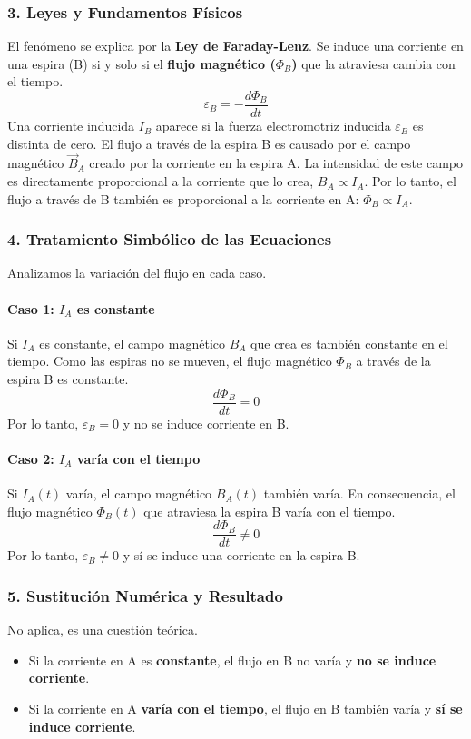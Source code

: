\subsubsection*{3. Leyes y Fundamentos Físicos}
El fenómeno se explica por la \textbf{Ley de Faraday-Lenz}. Se induce una corriente en una espira (B) si y solo si el \textbf{flujo magnético ($\Phi_B$)} que la atraviesa cambia con el tiempo.
$$\varepsilon_B = -\frac{d\Phi_B}{dt}$$
Una corriente inducida $I_B$ aparece si la fuerza electromotriz inducida $\varepsilon_B$ es distinta de cero.
El flujo a través de la espira B es causado por el campo magnético $\vec{B}_A$ creado por la corriente en la espira A. La intensidad de este campo es directamente proporcional a la corriente que lo crea, $B_A \propto I_A$. Por lo tanto, el flujo a través de B también es proporcional a la corriente en A: $\Phi_B \propto I_A$.

\subsubsection*{4. Tratamiento Simbólico de las Ecuaciones}
Analizamos la variación del flujo en cada caso.
\paragraph*{Caso 1: $I_A$ es constante}
Si $I_A$ es constante, el campo magnético $B_A$ que crea es también constante en el tiempo. Como las espiras no se mueven, el flujo magnético $\Phi_B$ a través de la espira B es constante.
$$\frac{d\Phi_B}{dt} = 0$$
Por lo tanto, $\varepsilon_B = 0$ y no se induce corriente en B.

\paragraph*{Caso 2: $I_A$ varía con el tiempo}
Si $I_A(t)$ varía, el campo magnético $B_A(t)$ también varía. En consecuencia, el flujo magnético $\Phi_B(t)$ que atraviesa la espira B varía con el tiempo.
$$\frac{d\Phi_B}{dt} \neq 0$$
Por lo tanto, $\varepsilon_B \neq 0$ y sí se induce una corriente en la espira B.

\subsubsection*{5. Sustitución Numérica y Resultado}
No aplica, es una cuestión teórica.
\begin{cajaresultado}
\begin{itemize}
    \item Si la corriente en A es \textbf{constante}, el flujo en B no varía y \textbf{no se induce corriente}.
    \item Si la corriente en A \textbf{varía con el tiempo}, el flujo en B también varía y \textbf{sí se induce corriente}.
\end{itemize}
\end{cajaresultado}

